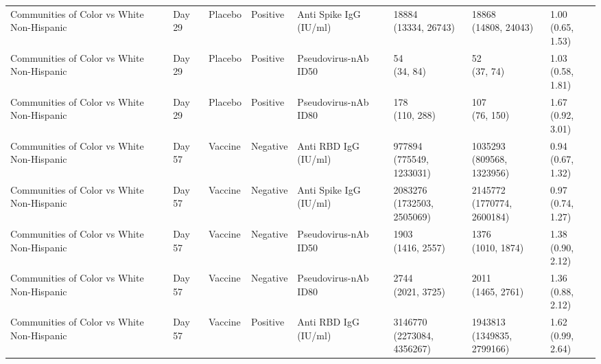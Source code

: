 \documentclass[]{book}
\theoremstyle{definition}
\theoremstyle{definition}
\theoremstyle{definition}
\newcommand{\1}{\mathbbm{1}}
\begin{document}
\begin{landscape}
\begin{ThreePartTable}
\begin{longtable}[t]{>{\raggedright\arraybackslash}p{2.7cm}lllllll}
Communities of Color vs White Non-Hispanic & Day 29 & Placebo & Positive & Anti Spike IgG (IU/ml) & \makecell[l]{18884\\(13334, 26743)} & \makecell[l]{18868\\(14808, 24043)} & \makecell[l]{1.00\\(0.65, 1.53)}\\
Communities of Color vs White Non-Hispanic & Day 29 & Placebo & Positive & Pseudovirus-nAb ID50 & \makecell[l]{54\\(34, 84)} & \makecell[l]{52\\(37, 74)} & \makecell[l]{1.03\\(0.58, 1.81)}\\
Communities of Color vs White Non-Hispanic & Day 29 & Placebo & Positive & Pseudovirus-nAb ID80 & \makecell[l]{178\\(110, 288)} & \makecell[l]{107\\(76, 150)} & \makecell[l]{1.67\\(0.92, 3.01)}\\
\addlinespace
Communities of Color vs White Non-Hispanic & Day 57 & Vaccine & Negative & Anti RBD IgG (IU/ml) & \makecell[l]{977894\\(775549, 1233031)} & \makecell[l]{1035293\\(809568, 1323956)} & \makecell[l]{0.94\\(0.67, 1.32)}\\
Communities of Color vs White Non-Hispanic & Day 57 & Vaccine & Negative & Anti Spike IgG (IU/ml) & \makecell[l]{2083276\\(1732503, 2505069)} & \makecell[l]{2145772\\(1770774, 2600184)} & \makecell[l]{0.97\\(0.74, 1.27)}\\
Communities of Color vs White Non-Hispanic & Day 57 & Vaccine & Negative & Pseudovirus-nAb ID50 & \makecell[l]{1903\\(1416, 2557)} & \makecell[l]{1376\\(1010, 1874)} & \makecell[l]{1.38\\(0.90, 2.12)}\\
Communities of Color vs White Non-Hispanic & Day 57 & Vaccine & Negative & Pseudovirus-nAb ID80 & \makecell[l]{2744\\(2021, 3725)} & \makecell[l]{2011\\(1465, 2761)} & \makecell[l]{1.36\\(0.88, 2.12)}\\
Communities of Color vs White Non-Hispanic & Day 57 & Vaccine & Positive & Anti RBD IgG (IU/ml) & \makecell[l]{3146770\\(2273084, 4356267)} & \makecell[l]{1943813\\(1349835, 2799166)} & \makecell[l]{1.62\\(0.99, 2.64)}\\

\end{longtable}
\end{ThreePartTable}
\end{landscape}
\end{document}
